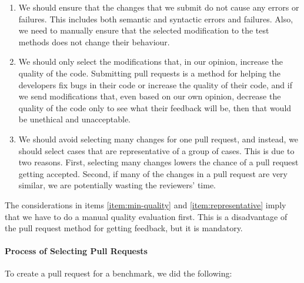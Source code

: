 \begin{enumerate}

  \item We should ensure that the changes that we submit do not cause any errors or failures. This includes both semantic and syntactic errors and failures. Also, we need to manually ensure that the selected modification to the test methods does not change their behaviour.

  \item \label{item:min-quality} We should only select the modifications that, in our opinion, increase the quality of the code. Submitting pull requests is a method for helping the developers fix bugs in their code or increase the quality of their code, and if we send modifications that, even based on our own opinion, decrease the quality of the code only to see what their feedback will be, then that would be unethical and unacceptable.

  \item \label{item:representative} We should avoid selecting many changes for one pull request, and instead, we should select cases that are representative of a group of cases. This is due to two reasons. First, selecting many changes lowers the chance of a pull request getting accepted. Second, if many of the changes in a pull request are very similar, we are potentially wasting the reviewers' time.
  
\end{enumerate}

The considerations in items \ref{item:min-quality} and \ref{item:representative} imply that we have to do a manual quality evaluation first. This is a disadvantage of the pull request method for getting feedback, but it is mandatory.


\paragraph{Process of Selecting Pull Requests} \label{section:selection-process}

To create a pull request for a benchmark, we did the following:

